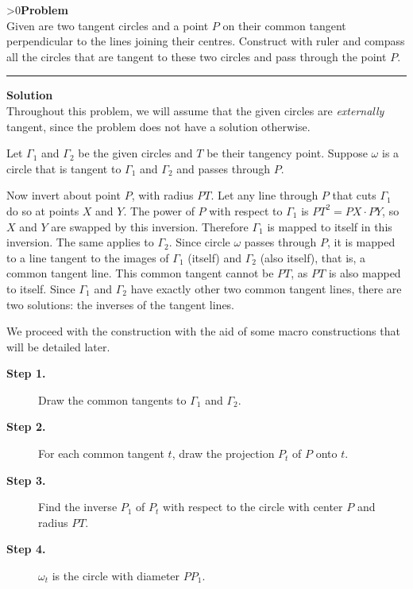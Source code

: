 \documentclass[12pt,oneside,a4paper]{book}
\newcounter{probnum}
\newcounter{solnum}
\newcommand{\prob}{\ifnum\value{probnum}>0\newpage\fi\setcounter{solnum}{0}\stepcounter{probnum}\textbf{Problem \theprobnum}\\}
\newcommand{\sol}{\medskip\hrule\medbreak\textbf{Solution}\\}
\begin{document}
\prob Given are two tangent circles and a point $P$ on their common tangent perpendicular to the lines joining their centres. Construct with ruler and compass all the circles that are tangent to these two circles and pass through the point $P$.

\sol
Throughout this problem, we will assume that the given circles are \emph{externally} tangent, since the problem does not have a solution otherwise.

Let $\Gamma_1$ and $\Gamma_2$ be the given circles and $T$ be their tangency point. Suppose $\omega$ is a circle that is tangent to $\Gamma_1$ and $\Gamma_2$ and passes through $P$.

Now invert about point $P$, with radius $PT$. Let any line through $P$ that cuts $\Gamma_1$ do so at points $X$ and $Y$. The power of $P$ with respect to $\Gamma_1$ is $PT^2 = PX\cdot PY$, so $X$ and $Y$ are swapped by this inversion. Therefore $\Gamma_1$ is mapped to itself in this inversion. The same applies to $\Gamma_2$. Since circle $\omega$ passes through $P$, it is mapped to a line tangent to the images of $\Gamma_1$ (itself) and $\Gamma_2$ (also itself), that is, a common tangent line. This common tangent cannot be $PT$, as $PT$ is also mapped to itself. Since $\Gamma_1$ and $\Gamma_2$ have exactly other two common tangent lines, there are two solutions: the inverses of the tangent lines.
\begin{center}
\end{center}

We proceed with the construction with the aid of some macro constructions that will be detailed later.
\begin{description}
\item[\bf Step 1.] Draw the common tangents to $\Gamma_1$ and $\Gamma_2$.
\item[\bf Step 2.] For each common tangent $t$, draw the projection $P_t$ of $P$ onto $t$.
\item[\bf Step 3.] Find the inverse $P_1$ of $P_t$ with respect to the circle with center $P$ and radius $PT$.
\item[\bf Step 4.] $\omega_t$ is the circle with diameter $PP_1$.
\end{description}
\end{document}

